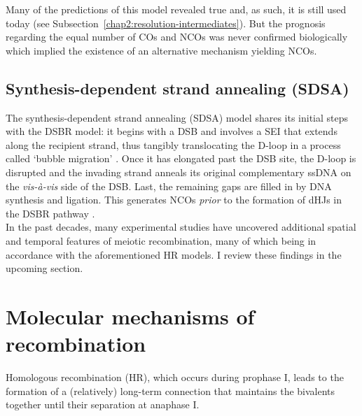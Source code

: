 Many of the predictions of this model revealed true and, as such, it is still used today (see Subsection~\ref{chap2:resolution-intermediates}).
But the prognosis regarding the equal number of COs and NCOs was never confirmed biologically \citep{bishop2004early} which implied the existence of an alternative mechanism yielding NCOs.





\subsection{Synthesis-dependent strand annealing (SDSA)}
\label{chap2:model-SDSA}

The synthesis-dependent strand annealing (SDSA) model \citep{resnick1976repair,nassif1994efficient,ferguson1996recombinational} shares its initial steps with the DSBR model: it begins with a DSB and involves a SEI that extends along the recipient strand, thus tangibly translocating the D-loop in a process called ‘bubble migration’ \citep[reviewed in][]{mcmahill2007synthesisdependent}.
Once it has elongated past the DSB site, the D-loop is disrupted and the invading strand anneals its original complementary ssDNA on the \textit{vis-\`a-vis} side of the DSB\@.
Last, the remaining gaps are filled in by DNA synthesis and ligation.
This generates NCOs \textit{prior} to the formation of dHJs in the DSBR pathway \citep{allers2001differential}.\\



In the past decades, many experimental studies have uncovered additional spatial and temporal features of meiotic recombination, many of which being in accordance with the aforementioned HR models. 
I review these findings in the upcoming section.













\section{Molecular mechanisms of recombination}

Homologous recombination (HR), which occurs during prophase I, leads to the formation of a (relatively) long-term connection that maintains the bivalents together until their separation at anaphase I\@.

